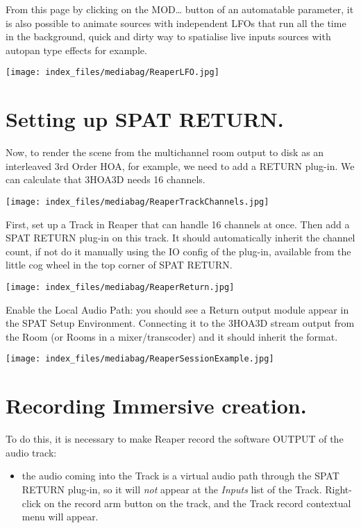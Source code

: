 \documentclass[
  letterpaper,
  DIV=11,
  numbers=noendperiod]{scrreport}
\providecommand{\tightlist}{%
  \setlength{\itemsep}{0pt}\setlength{\parskip}{0pt}}\usepackage{longtable,booktabs,array}
\begin{document}
From this page by clicking on the MOD\ldots{} button of an automatable
parameter, it is also possible to animate sources with independent LFOs
that run all the time in the background, quick and dirty way to
spatialise live inputs sources with autopan type effects for example.

\texttt{[image: index\_files/mediabag/ReaperLFO.jpg]}

\hypertarget{setting-up-spat-return.}{%
\section{Setting up SPAT RETURN.}\label{setting-up-spat-return.}}

Now, to render the scene from the multichannel room output to disk as an
interleaved 3rd Order HOA, for example, we need to add a RETURN plug-in.
We can calculate that 3HOA3D needs 16 channels.

\texttt{[image: index\_files/mediabag/ReaperTrackChannels.jpg]}

First, set up a Track in Reaper that can handle 16 channels at once.
Then add a SPAT RETURN plug-in on this track. It should automatically
inherit the channel count, if not do it manually using the IO config of
the plug-in, available from the little cog wheel in the top corner of
SPAT RETURN.

\texttt{[image: index\_files/mediabag/ReaperReturn.jpg]}

Enable the Local Audio Path: you should see a Return output module
appear in the SPAT Setup Environment. Connecting it to the 3HOA3D stream
output from the Room (or Rooms in a mixer/transcoder) and it should
inherit the format.

\texttt{[image: index\_files/mediabag/ReaperSessionExample.jpg]}

\hypertarget{recording-immersive-creation.}{%
\section{Recording Immersive
creation.}\label{recording-immersive-creation.}}

To do this, it is necessary to make Reaper record the software OUTPUT of
the audio track:

\begin{itemize}
\tightlist
\item
  the audio coming into the Track is a virtual audio path through the
  SPAT RETURN plug-in, so it will \emph{not} appear at the \emph{Inputs}
  list of the Track. Right-click on the record arm button on the track,
  and the Track record contextual menu will appear.
\end{itemize}
\end{document}
